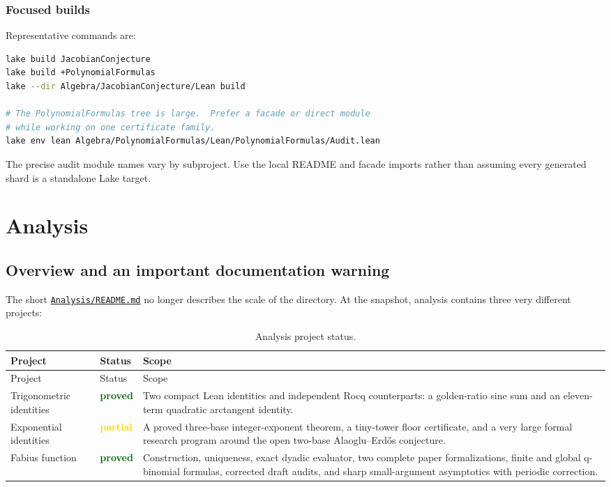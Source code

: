 \documentclass[
  10pt,
  a4paper,
  twoside,
  open=any,
  parskip=half,
  headings=big
]{scrreprt}
\newcommand{\CommitFull}{56a402bf82a9aab119fcbe3e96b991d387b221c5}
\newcommand{\RepoWeb}{https://github.com/VladimirReshetnikov/ProveIt}
\newcommand{\RepoBlobBase}{\RepoWeb/blob/\CommitFull}
\newcommand{\RepoFile}[1]{\href{\RepoBlobBase/#1}{\nolinkurl{#1}}}
\newcommand{\yes}{\textcolor{darkgreen}{\textbf{proved}}}
\newcommand{\partialstatus}{\textcolor{gold}{\textbf{partial}}}
\begin{document}
\subsection{Focused builds}

Representative commands are:

\begin{lstlisting}[language=bash]
lake build JacobianConjecture
lake build +PolynomialFormulas
lake --dir Algebra/JacobianConjecture/Lean build

# The PolynomialFormulas tree is large.  Prefer a facade or direct module
# while working on one certificate family.
lake env lean Algebra/PolynomialFormulas/Lean/PolynomialFormulas/Audit.lean
\end{lstlisting}

The precise audit module names vary by subproject. Use the local README and facade imports rather than assuming every generated shard is a standalone Lake target.


\chapter{Analysis}
\label{ch:analysis}

\section{Overview and an important documentation warning}

The short \RepoFile{Analysis/README.md} no longer describes the scale of the directory. At the snapshot, analysis contains three very different projects:

\begin{longtable}{@{}L{39mm}L{30mm}L{85mm}@{}}
\caption{Analysis project status.}\label{tab:analysis-status}\\
\toprule
Project & Status & Scope \\
\midrule
\endfirsthead
\toprule
Project & Status & Scope \\
\midrule
\endhead
\bottomrule
\endfoot
Trigonometric identities & \yes & Two compact Lean identities and independent Rocq counterparts: a golden-ratio sine sum and an eleven-term quadratic arctangent identity. \\
Exponential identities & \partialstatus & A proved three-base integer-exponent theorem, a tiny-tower floor certificate, and a very large formal research program around the open two-base Alaoglu--Erd\H{o}s conjecture. \\
Fabius function & \yes & Construction, uniqueness, exact dyadic evaluator, two complete paper formalizations, finite and global q-binomial formulas, corrected draft audits, and sharp small-argument asymptotics with periodic correction. \\
\end{longtable}
\end{document}
